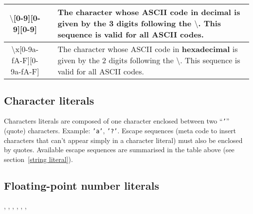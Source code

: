 \begin{tabular}{|c|c|p{7cm}|}
  \hline
  $\setminus$[0-9][0-9][0-9] &  & The character whose ASCII code in
                                  {\bf decimal} is given by the 3 digits
                                  following the $\setminus$. This
                                  sequence is valid for all
                                  ASCII codes. \\
  \hline
  $\setminus$x[0-9a-fA-F][0-9a-fA-F] & & The character whose ASCII code in
                                  {\bf hexadecimal} is given by the 2
                                  digits following the $\setminus$. This
                                  sequence is valid for all
                                  ASCII codes.\\
  \hline
\end{tabular}

\subsection{Character literals}
\label{character literals}

\begin{syn}
 \is
\end{syn}

Characters literals are composed of one character enclosed between two
``{\tt '}'' (quote) characters. Example: {\tt 'a'}, {\tt '?'}.
Escape sequences (meta code to insert characters that can't appear
simply in a character literal) must also be enclosed by
quotes. Available escape sequences are summarised in the table above
(see section~\ref{string literal}).

\subsection{Floating-point number literals}

\begin{syn}
 \is
   
\sep
{} \is
   
\sep
{} \is {} \orelse {}
\sep
{} \is
\sep
{} \is
\sep
{} \is
  \orelse {}
\sep
{} \is {} 
\end{syn}
  
